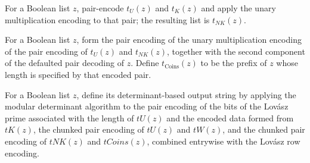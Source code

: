 \begin{definition}
\label{Randomized.Matching.tNK}
\leanok
{}
For a Boolean list $z$, pair-encode $t_U(z)$ and $t_K(z)$ and apply the unary
multiplication encoding to that pair; the resulting list is $t_{NK}(z)$.
\end{definition}

\begin{definition}
\label{Randomized.Matching.tCoins}
\leanok
{}
For a Boolean list $z$, form the pair encoding of the unary multiplication encoding of
the pair encoding of $t_U(z)$ and $t_{NK}(z)$, together with the second component of the
defaulted pair decoding of $z$. Define $t_{\mathrm{Coins}}(z)$ to be the prefix of $z$
whose length is specified by that encoded pair.
\end{definition}

\begin{definition}
\label{Randomized.Matching.tDet}
\leanok
{}
For a Boolean list $z$, define its determinant-based output string by applying the
modular determinant algorithm to the pair encoding of the bits of the Lovász prime
associated with the length of $tU(z)$ and the encoded data formed from $tK(z)$, the
chunked pair encoding of $tU(z)$ and $tW(z)$, and the chunked pair encoding of $tNK(z)$
and $tCoins(z)$, combined entrywise with the Lovász row encoding.
\end{definition}

